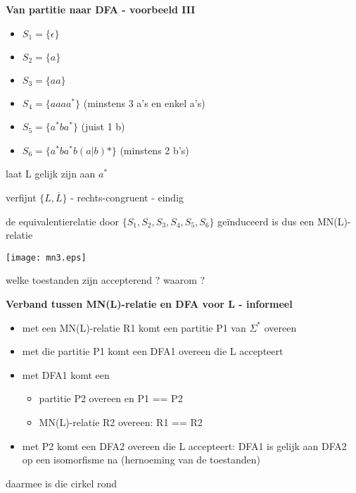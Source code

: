 \documentclass{seminar}
\newcommand{\openpagina}{}
\begin{document}
\begin{slide}
{\bf Van partitie naar DFA - voorbeeld III}

\begin{itemize}
\item $S_1 = \{\epsilon\}$
\item $S_2 = \{a\}$
\item $S_3 = \{aa\}$
\item $S_4 = \{aaaa^*\}$ (minstens 3 a's en enkel a's)
\item $S_5 = \{a^*ba^*\}$ (juist 1 b)
\item $S_6 = \{a^*ba^*b(a|b)*\}$ (minstens 2 b's)
\end{itemize}

laat L gelijk zijn aan $a^*$

verfijnt $\{L, \overline{L}\}$ - rechts-congruent - eindig

de equivalentierelatie door $\{S_1,S_2,S_3,S_4,S_5,S_6\}$
ge\"induceerd is dus een MN(L)-relatie

\end{slide} \openpagina

\begin{slide}
\texttt{[image: mn3.eps]}

\vspace{1cm}
welke toestanden zijn accepterend ? waarom ?
\end{slide} \openpagina

\begin{slide}
{\bf Verband tussen MN(L)-relatie en DFA voor L - informeel}

\begin{itemize}
\item met een MN(L)-relatie R1 komt een partitie P1 van $\Sigma^*$ overeen
\item met die partitie P1 komt een DFA1 overeen die L accepteert
\item met DFA1 komt een 
\begin{itemize}
\item partitie P2 overeen en P1 == P2
\item MN(L)-relatie R2 overeen: R1 == R2
\end{itemize}
\item met P2 komt een DFA2 overeen die L accepteert: DFA1 is gelijk
aan DFA2 op een isomorfisme na (hernoeming van de toestanden)
\end{itemize}

daarmee is die cirkel rond\
\end{slide} \openpagina
\end{document}
